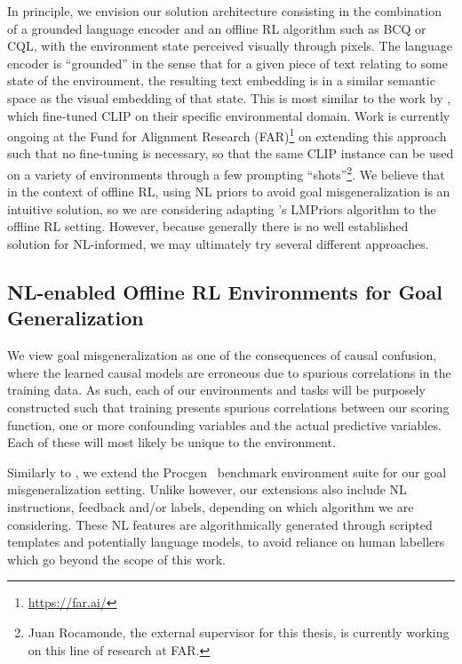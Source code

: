 \documentclass[../main.tex]{subfiles}
\begin{document}
In principle, we envision our solution architecture consisting in the combination of a grounded
language encoder and an offline RL algorithm such as BCQ or CQL, with the environment state
perceived visually through pixels. The language encoder is ``grounded'' in the sense that for
a given piece of text relating to some state of the environment, the resulting text embedding is in
a similar semantic space as the visual embedding of that state. This is most similar to the work by
\citet{fan_minedojo_2022}, which fine-tuned CLIP \citep{radford_learning_2021} on their specific
environmental domain. Work is currently ongoing at the Fund for Alignment Research
(FAR)\footnote{\href{https://far.ai/}{https://far.ai/}} on extending this approach such that no
fine-tuning is necessary, so that the same CLIP instance can be used on a variety of environments
through a few prompting ``shots''\footnote{Juan Rocamonde, the external supervisor for this thesis,
	is currently working on this line of research at FAR.}. We believe that in the context of offline
RL, using NL priors to avoid goal misgeneralization is an intuitive solution, so we are considering
adapting \citet{choi_lmpriors_2022}'s LMPriors algorithm to the offline RL setting. However, because
generally there is no well established solution for NL-informed, we may ultimately try several
different approaches.

\subsection{NL-enabled Offline RL Environments for Goal Generalization}

We view goal misgeneralization as one of the consequences of causal confusion, where the learned
causal models are erroneous due to spurious correlations in the training data. As such, each of our
environments and tasks will be purposely constructed such that training presents spurious
correlations between our scoring function, one or more confounding variables and the actual
predictive variables. Each of these will most likely be unique to the environment.

Similarly to \citet{langosco_goal_2022}, we extend the Procgen~\citep{cobbe_leveraging_2020}
benchmark environment suite for our goal misgeneralization setting. Unlike
\citet{langosco_goal_2022} however, our extensions also include NL instructions, feedback and/or
labels, depending on which algorithm we are considering. These NL features are algorithmically
generated through scripted templates and potentially language models, to avoid reliance on human
labellers which go beyond the scope of this work.
\end{document}
